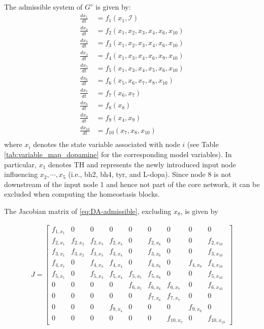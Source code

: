 \documentclass[pdflatex,sn-basic,Numbered]{sn-jnl}
\newcommand{\II}{{\mathcal I}}
\theoremstyle{thmstyleone}%
\numberwithin{equation}{section}
\begin{document}
The admissible system of $G^\diamond$ is given by:
\begin{equation}\label{eq:DA-admissible}
\begin{aligned}
\frac{dx_1}{dt} &= f_1(x_1, \II)\\
\frac{dx_2}{dt} &= f_2(x_1, x_2, x_3, x_4, x_6, x_{10})\\
\frac{dx_3}{dt} &= f_3(x_1, x_2, x_3, x_4, x_6, x_{10})\\
\frac{dx_4}{dt} &= f_4(x_1, x_3, x_4, x_6, x_9, x_{10})\\
\frac{dx_5}{dt} &= f_5(x_1, x_3, x_4, x_5, x_6, x_{10})\\
\frac{dx_6}{dt} &= f_6(x_5, x_6, x_7, x_8, x_{10})\\
\frac{dx_7}{dt} &= f_7(x_6, x_7)\\
\frac{dx_8}{dt} &= f_8(x_8)\\
\frac{dx_9}{dt} &= f_9(x_4, x_9)\\
\frac{dx_{10}}{dt} &= f_{10}(x_7, x_8, x_{10})\\
\end{aligned}
\end{equation}
where $x_i$ denotes the state variable associated with node $i$ (see Table \ref{tab:variable_map_dopamine} for the corresponding model variables). In particular, $x_1$ denotes TH and represents the newly introduced input node influencing $x_2,\cdots, x_5$ (i.e., bh2, bh4, tyr, and L-dopa). Since node 8 is not downstream of the input node 1 and hence not part of the core network, it can be excluded when computing the homeostasis blocks.  

The Jacobian matrix of \eqref{eq:DA-admissible}, excluding $x_8$, is given by 

$$\begin{gathered}
J=\left[
\begin{array}{ccccccccc}
f_{1,x_1} & 0 & 0 & 0 & 0 & 0 & 0 & 0 & 0\\
f_{2,x_1} & f_{2,x_2} & f_{2,x_3} & f_{2,x_4} & 0 & f_{2,x_6} & 0 & 0 & f_{2,x_{10}}\\
f_{3,x_1} & f_{3,x_2} & f_{3,x_3} & f_{3,x_4} & 0 & f_{3,x_6} & 0 & 0 & f_{3,x_{10}}\\
f_{4,x_1} & 0 & f_{4,x_3} & f_{4,x_4} & 0 & f_{4,x_6} & 0 & f_{4,x_9} & f_{4,x_{10}}\\
f_{5,x_1} & 0 & f_{5,x_3} & f_{5,x_4} & f_{5,x_5} & f_{5,x_6} & 0 & 0 & f_{5,x_{10}}\\
0 & 0 & 0 & 0 & f_{6,x_5} & f_{6,x_6} & f_{6,x_7} & 0 & f_{6,x_{10}}\\
0 & 0 & 0 & 0 & 0 & f_{7,x_6} & f_{7,x_7} & 0 & 0\\
0 & 0 & 0 & f_{9,x_4} & 0 & 0 & 0 & f_{9,x_9} & 0\\
0 & 0 & 0 & 0 & 0 & 0 & f_{10,x_7} & 0 & f_{10,x_{10}}
\end{array}
\right]
\end{gathered}$$
\end{document}
